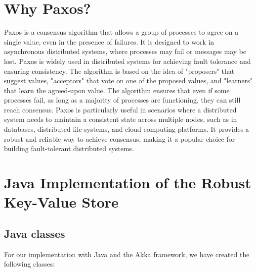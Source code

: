 \documentclass{article}
\begin{document}


\tableofcontents
\listoffigures

\newpage

\section{Why Paxos?}
Paxos is a consensus algorithm that allows a group of processes to agree on a single value, even in the presence of failures. It is designed to work in asynchronous distributed systems, where processes may fail or messages may be lost. Paxos is widely used in distributed systems for achieving fault tolerance and ensuring consistency.
The algorithm is based on the idea of "proposers" that suggest values, "acceptors" that vote on one of the proposed values, and "learners" that learn the agreed-upon value. The algorithm ensures that even if some processes fail, as long as a majority of processes are functioning, they can still reach consensus.
Paxos is particularly useful in scenarios where a distributed system needs to maintain a consistent state across multiple nodes, such as in databases, distributed file systems, and cloud computing platforms. It provides a robust and reliable way to achieve consensus, making it a popular choice for building fault-tolerant distributed systems.

\section{Java Implementation of the Robust Key-Value Store}

\subsection{Java classes}
For our implementation with Java and the Akka framework, we have created the following classes:
\end{document}
